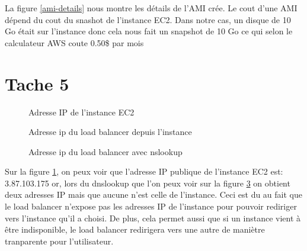 \documentclass[french,a4paper,11pt]{article}
\begin{document}
    La figure \ref{ami-details} nous montre les détails de l'AMI crée.
    Le cout d'une AMI dépend du cout du snashot de l'instance EC2.
    Dans notre cas, un disque de 10 Go était sur l'instance donc cela nous fait un snapshot de 10 Go ce qui selon le calculateur AWS coute 0.50\$ par mois

    \section{Tache 5}\label{sec:task-5}

    \begin{figure}
        \caption{\label{ec2-ip}Adresse IP de l'instance EC2}
    \end{figure}

    \begin{figure}
        \caption{\label{lb-ip}Adresse ip du load balancer depuis l'instance}
    \end{figure}

    \begin{figure}
        \caption{\label{dns-ip}Adresse ip du load balancer avec nslookup}
    \end{figure}

    Sur la figure \ref{ec2-ip}, on peux voir que l'adresse IP publique de l'instance EC2 est: 3.87.103.175 or, lors du
    dnslookup que l'on peux voir sur la figure \ref{dns-ip} on obtient deux adresses IP mais que aucune n'est celle de l'instance.
    Ceci est du au fait que le load balancer n'expose pas les adresses IP de l'instance pour pouvoir rediriger vers l'instance qu'il a choisi.
    De plus, cela permet aussi que si un instance vient à être indisponible, le load balancer redirigera vers une autre de maniètre tranparente pour l'utilisateur.
\end{document}
